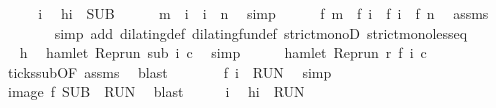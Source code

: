 \begin{isabellebody}
%
\isadelimproof
%
\endisadelimproof
%
\isatagproof
{}\isamarkupfalse%
\isanewline
\ \ \isacommand{{\isacharbraceleft}}\isamarkupfalse%
\ \isamarkupfalse%
\ i\ \isamarkupfalse%
\ h{\isacharcolon}{\isacartoucheopen}i\ {\isasymin}\ {\isacharquery}SUB{\isacartoucheclose}\isanewline
\ \ \ \ \isamarkupfalse%
\ {\isacartoucheopen}m\ {\isasymle}\ i\ {\isasymand}\ i\ {\isacharless}\ n{\isacartoucheclose}\ \isamarkupfalse%
\ simp\isanewline
\ \ \ \ \isamarkupfalse%
\ {\isacartoucheopen}f\ m\ {\isasymle}\ f\ i\ {\isasymand}\ f\ i\ {\isacharless}\ {\isacharparenleft}f\ n{\isacharparenright}{\isacartoucheclose}\ \isamarkupfalse%
\ assms\isanewline
\ \ \ \ \ \ \isamarkupfalse%
\ {\isacharparenleft}simp\ add{\isacharcolon}\ dilating{\isacharunderscore}def\ dilating{\isacharunderscore}fun{\isacharunderscore}def\ strict{\isacharunderscore}monoD\ strict{\isacharunderscore}mono{\isacharunderscore}less{\isacharunderscore}eq{\isacharparenright}\isanewline
\ \ \ \ \isamarkupfalse%
\ \isamarkupfalse%
\ h\ \isamarkupfalse%
\ {\isacartoucheopen}hamlet\ {\isacharparenleft}{\isacharparenleft}Rep{\isacharunderscore}run\ sub{\isacharparenright}\ i\ c{\isacharparenright}{\isacartoucheclose}\ \isamarkupfalse%
\ simp\isanewline
\ \ \ \ \isamarkupfalse%
\ {\isacartoucheopen}hamlet\ {\isacharparenleft}{\isacharparenleft}Rep{\isacharunderscore}run\ r{\isacharparenright}\ {\isacharparenleft}f\ i{\isacharparenright}\ c{\isacharparenright}{\isacartoucheclose}\ \isamarkupfalse%
\ ticks{\isacharunderscore}sub{\isacharbrackleft}OF\ assms{\isacharbrackright}\ \isamarkupfalse%
\ blast\isanewline
\ \ \ \ \isamarkupfalse%
\ \isamarkupfalse%
\ {\isacartoucheopen}f\ i\ {\isasymin}\ {\isacharquery}RUN{\isacartoucheclose}\ \isamarkupfalse%
\ simp\isanewline
\ \ \isacommand{{\isacharbraceright}}\isamarkupfalse%
\ \isamarkupfalse%
\ {\isacartoucheopen}image\ f\ {\isacharquery}SUB\ {\isasymsubseteq}\ {\isacharquery}RUN{\isacartoucheclose}\ \isamarkupfalse%
\ blast\isanewline
{}\isamarkupfalse%
\isanewline
\ \ \isacommand{{\isacharbraceleft}}\isamarkupfalse%
\ \isamarkupfalse%
\ i\ \isamarkupfalse%
\ h{\isacharcolon}{\isacartoucheopen}i\ {\isasymin}\ {\isacharquery}RUN{\isacartoucheclose}\isanewline
\ \ \ \ \isamarkupfalse%

\end{isabellebody}
